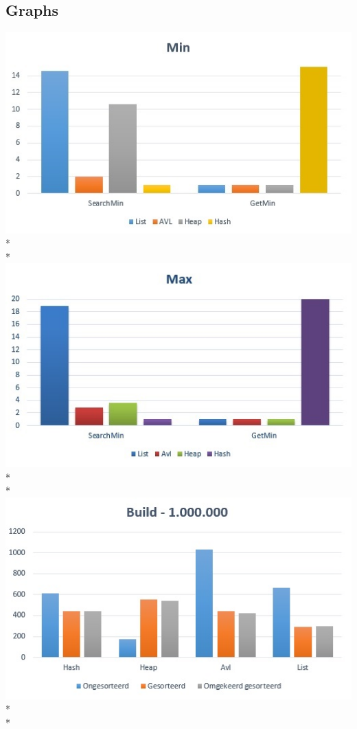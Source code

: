 \documentclass{article}
\begin{document}
\subsection{Graphs}
\includegraphics{MinGrafiek}\\*\\*
\includegraphics{MaxGrafiek} \\*\\*
\includegraphics{BuildGrafiek} \\*\\*
\end{document}
